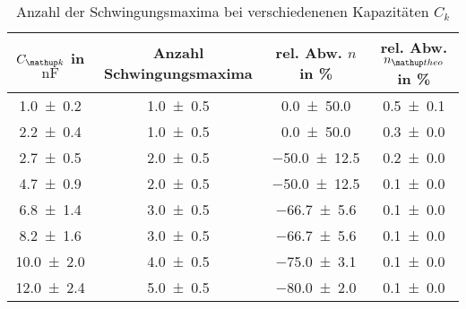 \begin{table} 
\centering 
\caption{Anzahl der Schwingungsmaxima bei verschiedenenen Kapazitäten $C_k$} 
\label{fig:teila_n_ck} 
\begin{tabular}{S S S S } 
\toprule  
{$C\ua{k}$ in $\si{\nano\farad}$} & {Anzahl Schwingungsmaxima} & {rel. Abw. $n$ in \%} & {rel. Abw. $n\ua{theo}$ in \%}  \\ 
\midrule  
 \num{1.0\pm0.2} & \num{1.0\pm0.5} & \num{0.0\pm50.0} & \num{0.5\pm0.1}\\ 
\num{2.2\pm0.4} & \num{1.0\pm0.5} & \num{0.0\pm50.0} & \num{0.3\pm0.0}\\ 
\num{2.7\pm0.5} & \num{2.0\pm0.5} & \num{-50.0\pm12.5} & \num{0.2\pm0.0}\\ 
\num{4.7\pm0.9} & \num{2.0\pm0.5} & \num{-50.0\pm12.5} & \num{0.1\pm0.0}\\ 
\num{6.8\pm1.4} & \num{3.0\pm0.5} & \num{-66.7\pm5.6} & \num{0.1\pm0.0}\\ 
\num{8.2\pm1.6} & \num{3.0\pm0.5} & \num{-66.7\pm5.6} & \num{0.1\pm0.0}\\ 
\num{10.0\pm2.0} & \num{4.0\pm0.5} & \num{-75.0\pm3.1} & \num{0.1\pm0.0}\\ 
\num{12.0\pm2.4} & \num{5.0\pm0.5} & \num{-80.0\pm2.0} & \num{0.1\pm0.0}\\ 
\bottomrule 
\end{tabular} 
\end{table}
